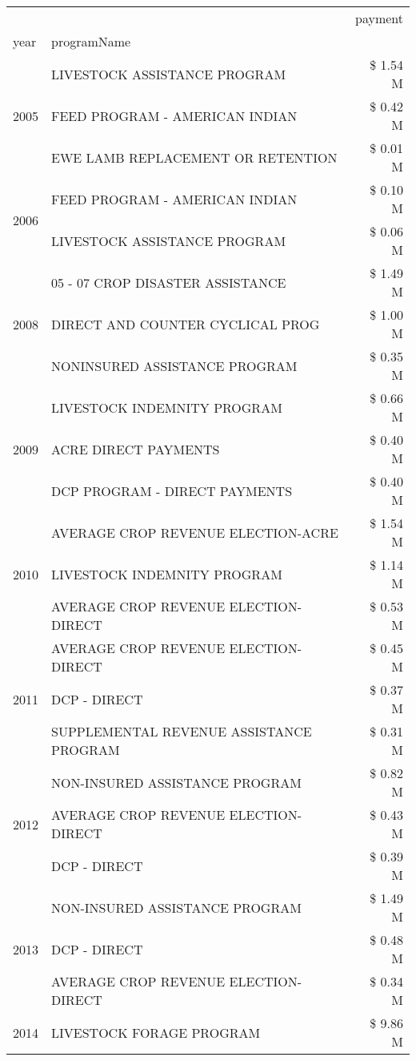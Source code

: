\begin{tabular}{llr}
\toprule
 &  & payment \\
year & programName &  \\
\midrule
\multirow[t]{3}{*}{2005} & LIVESTOCK ASSISTANCE PROGRAM & \$ 1.54 M \\
 & FEED PROGRAM - AMERICAN INDIAN & \$ 0.42 M \\
 & EWE LAMB REPLACEMENT OR RETENTION & \$ 0.01 M \\
\cline{1-3}
\multirow[t]{2}{*}{2006} & FEED PROGRAM - AMERICAN INDIAN & \$ 0.10 M \\
 & LIVESTOCK ASSISTANCE PROGRAM & \$ 0.06 M \\
\cline{1-3}
\multirow[t]{3}{*}{2008} & 05 - 07 CROP DISASTER ASSISTANCE & \$ 1.49 M \\
 & DIRECT AND COUNTER CYCLICAL PROG & \$ 1.00 M \\
 & NONINSURED ASSISTANCE PROGRAM & \$ 0.35 M \\
\cline{1-3}
\multirow[t]{3}{*}{2009} & LIVESTOCK INDEMNITY PROGRAM & \$ 0.66 M \\
 & ACRE DIRECT PAYMENTS & \$ 0.40 M \\
 & DCP PROGRAM - DIRECT PAYMENTS & \$ 0.40 M \\
\cline{1-3}
\multirow[t]{3}{*}{2010} & AVERAGE CROP REVENUE ELECTION-ACRE & \$ 1.54 M \\
 & LIVESTOCK INDEMNITY PROGRAM & \$ 1.14 M \\
 & AVERAGE CROP REVENUE ELECTION-DIRECT & \$ 0.53 M \\
\cline{1-3}
\multirow[t]{3}{*}{2011} & AVERAGE CROP REVENUE ELECTION-DIRECT & \$ 0.45 M \\
 & DCP - DIRECT & \$ 0.37 M \\
 & SUPPLEMENTAL REVENUE ASSISTANCE PROGRAM & \$ 0.31 M \\
\cline{1-3}
\multirow[t]{3}{*}{2012} & NON-INSURED ASSISTANCE PROGRAM & \$ 0.82 M \\
 & AVERAGE CROP REVENUE ELECTION-DIRECT & \$ 0.43 M \\
 & DCP - DIRECT & \$ 0.39 M \\
\cline{1-3}
\multirow[t]{3}{*}{2013} & NON-INSURED ASSISTANCE PROGRAM & \$ 1.49 M \\
 & DCP - DIRECT & \$ 0.48 M \\
 & AVERAGE CROP REVENUE ELECTION-DIRECT & \$ 0.34 M \\
\cline{1-3}
\multirow[t]{3}{*}{2014} & LIVESTOCK FORAGE PROGRAM & \$ 9.86 M \\

\end{tabular}
